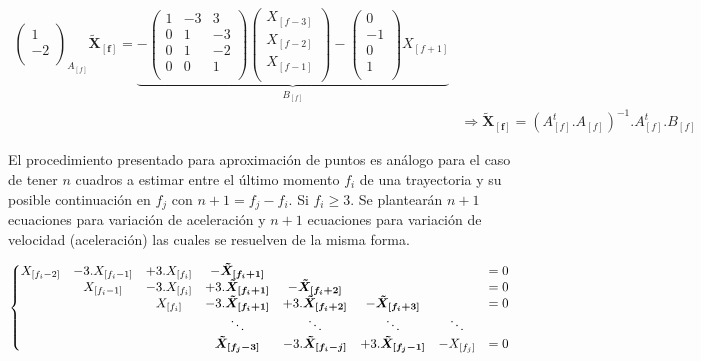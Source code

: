 {\begin{equation}
\begin{split}
{\begin{pmatrix}
1\\
-2\\
\end{pmatrix}
}_{A_{[f]}}\boldsymbol{\tilde{X}_{[f]}} = \underbrace{- \begin{pmatrix}
1 &-3 &3\\
0 &1 &-3\\
0 &1 &-2\\
0 &0 &1\\
\end{pmatrix}
\begin{pmatrix}
X_{[f-3]}\\
X_{[f-2]}\\
X_{[f-1]}\\
\end{pmatrix} - \begin{pmatrix}
0\\
-1\\
0\\
1\\
\end{pmatrix}
X_{[f+1]}}_{B_{[f]}} \\
&\Rightarrow \boldsymbol{\tilde{X}_{[f]}} = \left( A_{[f]}^{t}.A_{[f]}\right)^{-1}.A_{[f]}^{t}.B_{[f]}
\end{split}
\label{matrices_estimacion_01}
\end{equation}}

El procedimiento presentado para aproximación de puntos es análogo para el caso de tener $n$ cuadros a estimar entre el último momento $f_{i}$ de una trayectoria y su posible continuación en $f_{j}$ con $n+1=f_{j}-f_{i}$. Si $f_{i} \geq 3$. Se plantearán $n+1$ ecuaciones para variación de aceleración y $n+1$ ecuaciones para variación de velocidad (aceleración) las cuales se resuelven de la misma forma. 

{\scriptsize \begin{equation}
\hspace{-0cm}
\left\{
\begin{matrix}
X_{[f_{i}-2]} &-3.X_{[f_{i}-1]} &+3.X_{[f_{i}]} &-\boldsymbol{\tilde{X}_{[f_{i}+1]}} & & & &=0 \\
& X_{[f_{i}-1]} &-3.X_{[f_{i}]} &+3.\boldsymbol{\tilde{X}_{[f_{i}+1]}} &-\boldsymbol{\tilde{X}_{[f_{i}+2]}} & & &=0 \\
& & X_{[f_{i}]} &-3.\boldsymbol{\tilde{X}_{[f_{i}+1]}} &+3.\boldsymbol{\tilde{X}_{[f_{i}+2]}} &-\boldsymbol{\tilde{X}_{[f_{i}+3]}}& &=0 \\
& & & \ddots & \ddots & \ddots & \ddots & \\
& & & \boldsymbol{\tilde{X}_{[f_{j}-3]}} &-3.\boldsymbol{\tilde{X}_{[f_{i}-j]}} &+3.\boldsymbol{\tilde{X}_{[f_{j}-1]}} &-X_{[f_{j}]} &=0 \\
\end{matrix}
\right.
\label{ecuaciones_estimacion_n}
\end{equation}}


